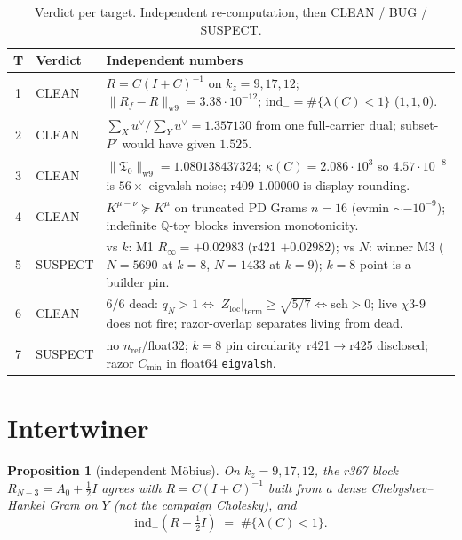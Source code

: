 \documentclass[11pt]{article}
\newtheorem{prop}{Proposition}
\theoremstyle{remark}
\newcommand{\Cmin}{C_{\min}}
\newcommand{\Tnull}{\mathfrak{T}_0}
\newcommand{\Zloc}{Z_{\mathrm{loc}}}
\begin{document}
\begin{table}[h]
\centering
\caption{Verdict per target.  Independent
re-computation, then CLEAN / BUG / SUSPECT.}
\label{tab:verdict}
\small
\begin{tabular}{@{}clp{7.6cm}@{}}
\toprule
T & Verdict & Independent numbers \\
\midrule
1 & CLEAN
  & $R=C(I+C)^{-1}$ on $k_z=9,17,12$;
    $\|R_f-R\|_{\mathrm{w9}}=3.38\cdot10^{-12}$;
    $\mathrm{ind}_-=\#\{\lambda(C)<1\}$
    ($1,1,0$). \\
2 & CLEAN
  & $\sum_X u^\vee/\sum_Y u^\vee=1.357130$
    from one full-carrier dual; subset-$P'$
    would have given $1.525$. \\
3 & CLEAN
  & $\|\Tnull\|_{\mathrm{w9}}=1.080138437324$;
    $\kappa(C)=2.086\cdot10^3$ so
    $4.57\cdot10^{-8}$ is $56\times$ eigvalsh
    noise; r409 $1.00000$ is display rounding. \\
4 & CLEAN
  & $K^{\mu-\nu}\succeq K^\mu$ on truncated
    PD Grams $n=16$ (evmin $\sim-10^{-9}$);
    indefinite $\mathbb{Q}$-toy blocks
    inversion monotonicity. \\
5 & SUSPECT
  & vs $k$: M1 $R_\infty=+0.02983$ (r421
    $+0.02982$); vs $N$: winner M3
    ($N=5690$ at $k=8$, $N=1433$ at $k=9$);
    $k=8$ point is a builder pin. \\
6 & CLEAN
  & $6/6$ dead: $q_N>1\Leftrightarrow
    |\Zloc|_{\mathrm{term}}\ge\sqrt{5/7}
    \Leftrightarrow\mathrm{sch}>0$;
    live $\chi3$-$9$ does not fire;
    razor-overlap separates living from dead. \\
7 & SUSPECT
  & no $n_{\mathrm{ref}}$/float32;
    $k=8$ pin circularity r421$\to$r425
    disclosed; razor $\Cmin$ in float64
    \texttt{eigvalsh}. \\
\bottomrule
\end{tabular}
\end{table}

\section{Intertwiner}\label{sec:T1}

\begin{prop}[independent M\"obius]\label{prop:int}
On $k_z=9,17,12$, the r367 block
$R_{N-3}=A_0+\tfrac12 I$ agrees with
$R=C(I+C)^{-1}$ built from a dense
Chebyshev--Hankel Gram on $Y$
(not the campaign Cholesky), and
\[
  \mathrm{ind}_-(R-\tfrac12 I)
  \;=\;
  \#\{\lambda(C)<1\}.
\]
\end{prop}
\end{document}
